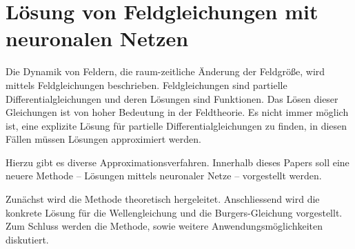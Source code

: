 %
%
%
%
\chapter{Lösung von Feldgleichungen mit neuronalen Netzen\label{chapter:neuronal}}
\begin{refsection}

Die Dynamik von Feldern, die raum-zeitliche Änderung der Feldgröße, wird mittels Feldgleichungen beschrieben.
Feldgleichungen sind partielle Differentialgleichungen und deren Lösungen sind Funktionen.
Das Lösen dieser Gleichungen ist von hoher Bedeutung in der Feldtheorie.
Es nicht immer möglich ist, eine explizite Lösung für partielle Differentialgleichungen zu finden, in diesen Fällen müssen Lösungen approximiert werden.

Hierzu gibt es diverse Approximationsverfahren.
Innerhalb dieses Papers soll eine neuere Methode -- Lösungen mittels neuronaler Netze -- vorgestellt werden.

Zunächst wird die Methode theoretisch hergeleitet.
Anschliessend wird die konkrete Lösung für die Wellengleichung und die Burgers-Gleichung vorgestellt.
Zum Schluss werden die Methode, sowie weitere Anwendungsmöglichkeiten diskutiert.






\printbibliography[heading=subbibliography]
\end{refsection}
